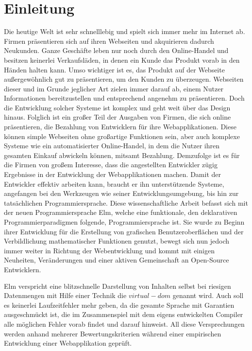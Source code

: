 \chapter{Einleitung}
\label{sec:einleitung}
Die heutige Welt ist sehr schnelllebig und spielt sich immer mehr im Internet ab. Firmen präsentieren sich auf ihren Webseiten und akquirieren dadurch Neukunden. Ganze Geschäfte leben nur noch durch den Online-Handel und besitzen keinerlei Verkaufsläden, in denen ein Kunde das Produkt vorab in den Händen halten kann. Umso wichtiger ist es, das Produkt auf der Webseite außergewöhnlich gut zu präsentieren, um den Kunden zu überzeugen. Webseiten dieser und im Grunde jeglicher Art zielen immer darauf ab, einem Nutzer Informationen bereitzustellen und entsprechend angenehm zu präsentieren. Doch die Entwicklung solcher Systeme ist komplex und geht weit über das Design hinaus. Folglich ist ein großer Teil der Ausgaben von Firmen, die sich online präsentieren, die Bezahlung von Entwicklern für ihre Webapplikationen. Diese können simple Webseiten ohne großartige Funktionen sein, aber auch komplexe Systeme wie ein automatisierter Online-Handel, in dem die Nutzer ihren gesamten Einkauf abwickeln können, mitsamt Bezahlung. Demzufolge ist es für die Firmen von großem Interesse, dass die angestellten Entwickler zügig Ergebnisse in der Entwicklung der Webapplikationen machen. Damit der Entwickler effektiv arbeiten kann, braucht er ihn unterstützende Systeme, angefangen bei den Werkzeugen wie seiner Entwicklungsumgebung, bis hin zur tatsächlichen Programmiersprache. Diese wissenschaftliche Arbeit befasst sich mit der neuen Programmiersprache Elm, welche eine funktionale, den deklarativen Programmierparadigmen folgende, Programmiersprache ist. Sie wurde zu Beginn ihrer Entwicklung für die Erstellung von grafischen Benutzeroberflächen und der Verbildlichung mathematischer Funktionen genutzt, bewegt sich nun jedoch immer weiter in Richtung der Webentwicklung und kommt mit einigen Neuheiten, Veränderungen und einer aktiven Gemeinschaft an Open-Source Entwicklern.

Elm verspricht eine blitzschnelle Darstellung von Inhalten selbst bei riesigen Datenmengen mit Hilfe einer Technik die $virtual-dom$ genannt wird. Auch soll es keinerlei Laufzeitfehler mehr geben, da die gesamte Sprache mit Garantien ausgeschmückt ist, die im Zusammenspiel mit dem eigens entwickelten Compiler alle möglichen Fehler vorab findet und darauf hinweist.
All diese Versprechungen werden anhand mehrerer Bewertungskriterien während einer empirischen Entwicklung einer Webapplikation geprüft.